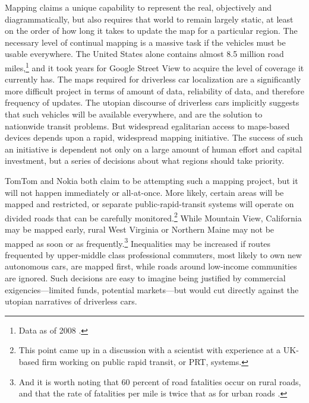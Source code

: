 Mapping claims a unique capability to
represent the real, objectively
and diagrammatically, but also requires that world to remain largely
static, at least on the order of how long it takes to update the map
for a particular region. The necessary level of continual mapping is a massive task if the
vehicles must be usable everywhere. The United States alone contains almost
8.5 million road miles,\footnote{Data as of 2008 \cite{carneyMiles}.}
and it took years for Google Street View to acquire the level of
coverage it currently has. The maps required for driverless car
localization are a significantly more difficult project in terms of
amount of data, reliability of data, and therefore frequency of
updates. The utopian discourse of driverless cars
implicitly suggests that such vehicles will be available everywhere,
and are the solution to nationwide transit problems. But widespread
egalitarian access to maps-based devices depends upon a rapid,
widespread mapping initiative. The success of such an initiative is
dependent not only on a large amount of human effort and capital
investment, but a series of decisions about what regions should take priority.

TomTom \cite{tomtommaps} and Nokia \cite{ubergizmo} both claim to be attempting such
a mapping project,
but it will not happen immediately or all-at-once. More likely,
certain areas will be 
mapped and restricted, or separate public-rapid-transit
systems will operate on divided roads that can be carefully
monitored.\footnote{This point came up in a discussion with a
  scientist with experience at a UK-based firm working on public
  rapid transit, or PRT, systems.} While
Mountain View, California may be mapped early, rural West Virginia or
Northern Maine may not be mapped as soon or as
frequently.\footnote{And it is worth noting that 60 percent of road
  fatalities occur on rural roads, and that the rate of fatalities per
mile is twice that as for urban roads \cite[p. 11]{broviakCars}.}
Inequalities may be increased if routes frequented by upper-middle
class professional commuters, most likely to own new autonomous cars,
are mapped first, while roads around low-income communities are
ignored. Such decisions are easy to imagine being justified by
commercial exigencies---limited funds, potential markets---but would
cut directly against the utopian narratives of driverless cars.

